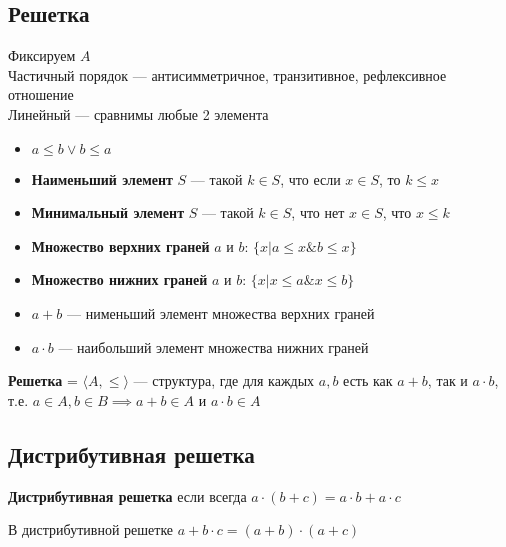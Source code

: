 \documentclass[english]{article}
\begin{document}
\subsection{Решетка}
\label{sec:org03ce24e}
\begin{definition}
	Фиксируем \(A\) \\
	Частичный порядок --- антисимметричное, транзитивное, рефлексивное отношение \\
	Линейный --- сравнимы любые 2 элемента \\
	\begin{itemize}
		\item \(a \le b \vee b \le a\)
		\item \textbf{Наименьший элемент} \(S\) --- такой \(k \in S\), что если \(x \in S\), то \(k \le x\)
		\item \textbf{Минимальный элемент} \(S\) --- такой \(k \in S\), что нет \(x \in S\), что \(x \le k\)
	\end{itemize}
	\label{org98a83aa}
\end{definition}
\begin{definition}
	\-
	\begin{itemize}
		\item \textbf{Множество верхних граней} \(a\) и \(b\): \(\{x \big| a \le x \& b \le x\}\)
		\item \textbf{Множество нижних граней} \(a\) и \(b\): \(\{x \big| x \le a \& x \le b\}\)
	\end{itemize}
	\label{org7193a41}
\end{definition}
\begin{definition}
	\-
	\begin{itemize}
		\item \textbf{\(a + b\)} --- нименьший элемент множества верхних граней
		\item \textbf{\(a \cdot b\)} --- наибольший элемент множества нижних граней
	\end{itemize}
	\label{orgc83c072}
\end{definition}
\begin{definition}
	\textbf{Решетка} = \(\langle A, \le \rangle\) --- структура, где для каждых \(a, b\) есть как \(a + b\), так и \(a \cdot b\), \\
	т.е. \(a \in A, b \in B \implies a + b \in A\) и \(a \cdot b \in A\)
	\label{org74d6e99}
\end{definition}
\subsection{Дистрибутивная решетка}
\label{sec:orgc5109eb}
\begin{definition}
	\textbf{Дистрибутивная решетка} если всегда  \(a \cdot (b + c) = a \cdot b + a \cdot c\)
	\label{orgd41d985}
\end{definition}
\begin{lemma}
	В дистрибутивной решетке \(a + b\cdot c = (a + b) \cdot(a + c)\)
	\label{org1bc351e}
\end{lemma}
\end{document}
